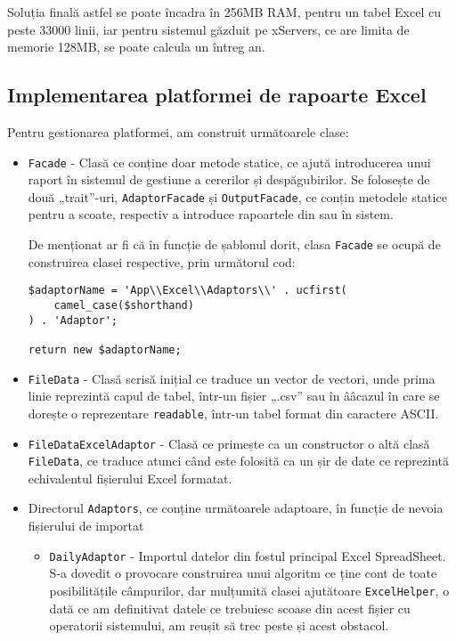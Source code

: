 	Soluția finală astfel se poate încadra în 256MB RAM, pentru un tabel Excel cu peste 33000 linii, iar pentru sistemul găzduit pe xServers, ce are limita de memorie 128MB, se poate calcula un întreg an.

	\subsection{Implementarea platformei de rapoarte Excel}

	Pentru gestionarea platformei, am construit următoarele clase:

	\begin{itemize}
		\item \verb|Facade| - Clasă ce conține doar metode statice, ce ajută introducerea unui raport în sistemul de gestiune a cererilor și despăgubirilor.
		Se folosește de două „trait”-uri, \verb|AdaptorFacade| și \verb|OutputFacade|, ce conțin metodele statice pentru a scoate, respectiv a introduce rapoartele din sau în sistem.

		De menționat ar fi că în funcție de șablonul dorit, clasa \verb|Facade| se ocupă de construirea clasei respective, prin următorul cod:
\begin{Verbatim}
$adaptorName = 'App\\Excel\\Adaptors\\' . ucfirst(
	camel_case($shorthand)
) . 'Adaptor';

return new $adaptorName;
 \end{Verbatim}

		\item \verb|FileData| - Clasă scrisă inițial ce traduce un vector de vectori, unde prima linie reprezintă capul de tabel, într-un fișier „.csv” sau în ââcazul în care se dorește o reprezentare \verb|readable|, într-un tabel format din caractere ASCII.
		\item \verb|FileDataExcelAdaptor| - Clasă ce primește ca un constructor o altă clasă \verb|FileData|, ce traduce atunci când este folosită ca un șir de date ce reprezintă echivalentul fișierului Excel formatat.
		\item Directorul \verb|Adaptors|, ce conține următoarele adaptoare, în funcție de nevoia fișierului de importat
		\begin{itemize}
			\item \verb|DailyAdaptor| - Importul datelor din fostul principal Excel SpreadSheet.
			S-a dovedit o provocare construirea unui algoritm ce ține cont de toate posibilitățile câmpurilor, dar mulțumită clasei ajutătoare \verb|ExcelHelper|, o dată ce am definitivat datele ce trebuiesc scoase din acest fișier cu operatorii sistemului, am reușit să trec peste și acest obstacol.


\end{itemize}
\end{itemize}
